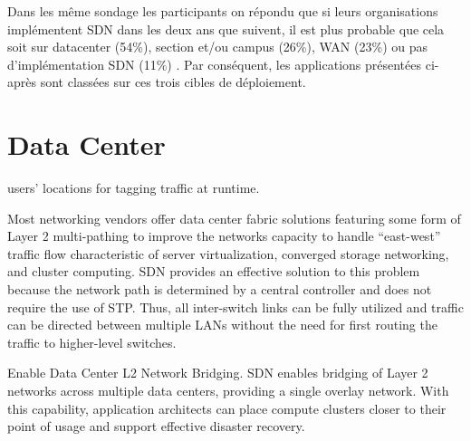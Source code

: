 Dans les même sondage les participants on répondu que si leurs organisations implémentent SDN dans les deux ans que suivent, il est plus probable que cela soit sur \gls{datacenter} (54\%), section et/ou campus (26\%), WAN (23\%) ou pas d'implémentation SDN (11\%) \cite{2013GuideSDNNVTable12}. Par conséquent, les applications présentées ci-après sont classées sur ces trois cibles de déploiement.




\section{Data Center}



users’ locations for tagging traffic at runtime.



Most networking vendors offer data center fabric solutions featuring some form of Layer 2 multi-pathing to improve the networks capacity to handle “east-west” traffic flow characteristic of server virtualization, converged storage networking, and cluster computing. SDN provides an effective solution to this problem because the network path is determined by a central controller and does not require the use of STP. Thus, all inter-switch links can be fully utilized and traffic can be directed between multiple LANs without the need for first routing the traffic to higher-level switches.

Enable Data Center L2 Network Bridging. SDN enables bridging of Layer 2 networks across multiple data centers, providing a single overlay network. With this capability, application architects can place compute clusters closer to their point of usage and support effective disaster recovery.

